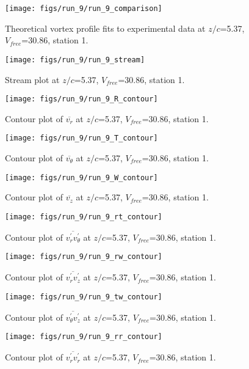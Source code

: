 \begin{figure}[H]
\centering
\texttt{[image: figs/run\_9/run\_9\_comparison]}
\caption{Theoretical vortex profile fits to experimental data at $z/c$=5.37, $V_{free}$=30.86, station 1.}
\end{figure}


\begin{figure}[H]
\centering
\texttt{[image: figs/run\_9/run\_9\_stream]}
\caption{Stream plot at $z/c$=5.37, $V_{free}$=30.86, station 1.}
\end{figure}


\begin{figure}[H]
\centering
\texttt{[image: figs/run\_9/run\_9\_R\_contour]}
\caption{Contour plot of $\overline{v_{r}}$ at $z/c$=5.37, $V_{free}$=30.86, station 1.}
\end{figure}


\begin{figure}[H]
\centering
\texttt{[image: figs/run\_9/run\_9\_T\_contour]}
\caption{Contour plot of $\overline{v_{\theta}}$ at $z/c$=5.37, $V_{free}$=30.86, station 1.}
\end{figure}


\begin{figure}[H]
\centering
\texttt{[image: figs/run\_9/run\_9\_W\_contour]}
\caption{Contour plot of $\overline{v_{z}}$ at $z/c$=5.37, $V_{free}$=30.86, station 1.}
\end{figure}


\begin{figure}[H]
\centering
\texttt{[image: figs/run\_9/run\_9\_rt\_contour]}
\caption{Contour plot of $\overline{v_{r}^{\prime} v_{\theta}^{\prime}}$ at $z/c$=5.37, $V_{free}$=30.86, station 1.}
\end{figure}


\begin{figure}[H]
\centering
\texttt{[image: figs/run\_9/run\_9\_rw\_contour]}
\caption{Contour plot of $\overline{v_{r}^{\prime} v_{z}^{\prime}}$ at $z/c$=5.37, $V_{free}$=30.86, station 1.}
\end{figure}


\begin{figure}[H]
\centering
\texttt{[image: figs/run\_9/run\_9\_tw\_contour]}
\caption{Contour plot of $\overline{v_{\theta}^{\prime} v_{z}^{\prime}}$ at $z/c$=5.37, $V_{free}$=30.86, station 1.}
\end{figure}


\begin{figure}[H]
\centering
\texttt{[image: figs/run\_9/run\_9\_rr\_contour]}
\caption{Contour plot of $\overline{v_{r}^{\prime} v_{r}^{\prime}}$ at $z/c$=5.37, $V_{free}$=30.86, station 1.}
\end{figure}


